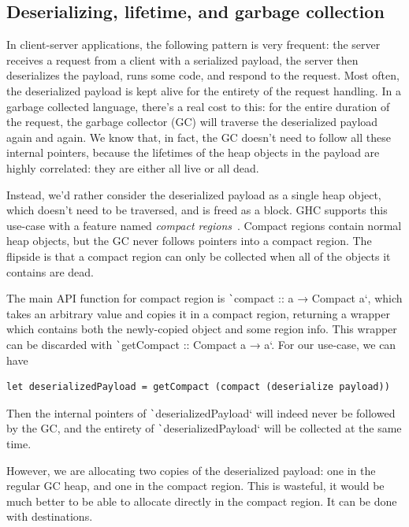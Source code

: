\documentclass[english]{jflart}
\begin{document}
\subsection{Deserializing, lifetime, and garbage collection}\label{ssec:parser-sexpr}

In client-server applications, the following pattern is very frequent: the server receives a request from a client with a serialized payload, the server then deserializes the payload, runs some code, and respond to the request. Most often, the deserialized payload is kept alive for the entirety of the request handling. In a garbage collected language, there's a real cost to this: for the entire duration of the request, the garbage collector (GC) will traverse the deserialized payload again and again. We know that, in fact, the GC doesn't need to follow all these internal pointers, because the lifetimes of the heap objects in the payload are highly correlated: they are either all live or all dead.

Instead, we'd rather consider the deserialized payload as a single heap object, which doesn't need to be traversed, and is freed as a block. GHC supports this use-case with a feature named \emph{compact regions}~\cite{yang_efficient_2015}. Compact regions contain normal heap objects, but the GC never follows pointers into a compact region. The flipside is that a compact region can only be collected when all of the objects it contains are dead.

The main API function for compact region is \texttt`compact :: a → Compact a`, which takes an arbitrary value and copies it in a compact region, returning a wrapper which contains both the newly-copied object and some region info. This wrapper can be discarded with \texttt`getCompact :: Compact a → a`. For our use-case, we can have

{\small
\begin{verbatim}
let deserializedPayload = getCompact (compact (deserialize payload))
\end{verbatim}
}

Then the internal pointers of \texttt`deserializedPayload` will indeed never be followed by the GC, and the entirety of \texttt`deserializedPayload` will be collected at the same time.

However, we are allocating two copies of the deserialized payload: one in the regular GC heap, and one in the compact region. This is wasteful, it would be much better to be able to allocate directly in the compact region. It can be done with destinations.
\end{document}
